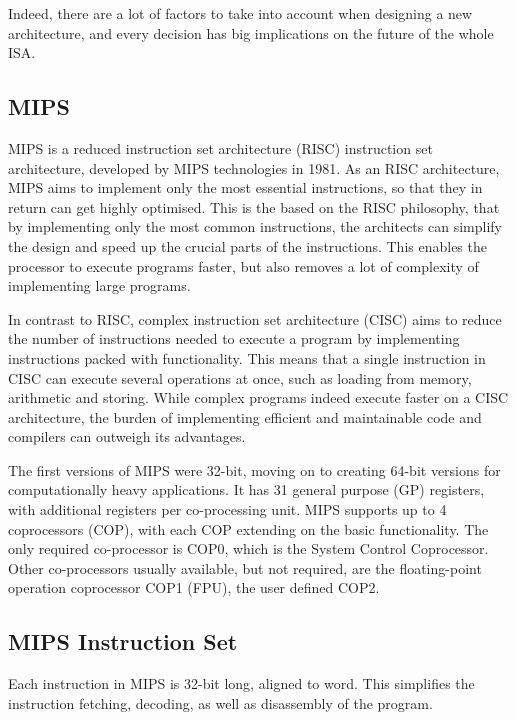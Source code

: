 Indeed, there are a lot of factors to take into account when designing a new
architecture, and every decision has big implications on the future of the
whole ISA.

\subsection{MIPS}
MIPS is a reduced instruction set architecture (RISC) instruction set
architecture, developed by MIPS technologies in 1981. As an RISC
architecture, MIPS aims to implement only the most essential instructions, so
that they in return can get highly optimised. This is the based on the RISC
philosophy, that by implementing only the most common instructions, the
architects can simplify the design and speed up the crucial parts of the
instructions. This enables the processor to execute programs faster, but also
removes a lot of complexity of implementing large programs.

In contrast to RISC, complex instruction set architecture (CISC) aims
to reduce the number of instructions needed to execute a program by
implementing instructions packed with functionality. This means that a single
instruction in CISC can execute several operations at once, such as loading from memory, arithmetic
and storing. While complex programs indeed execute faster on a CISC architecture,
the burden of implementing efficient and maintainable code and compilers can
outweigh its advantages. \cite{Patterson:1980:CRI:641914.641917}

The first versions of MIPS were 32-bit, moving on to creating 64-bit versions
for computationally heavy applications. It has 31 general purpose (GP)
registers, with additional registers per co-processing unit. MIPS supports up
to 4 coprocessors (COP), with each COP extending on the basic functionality. The
only required co-processor is COP0, which is the System Control Coprocessor.
Other co-processors usually available, but not required, are the floating-point operation
coprocessor COP1 (FPU), the user defined COP2.


\subsection{MIPS Instruction Set}
Each instruction in MIPS is 32-bit long, aligned to word. This simplifies the
instruction fetching, decoding, as well as disassembly of the program.

